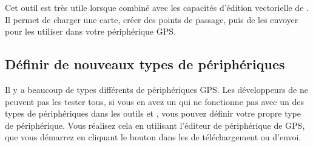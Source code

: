 Cet outil est très utile lorsque combiné avec les capacités d'édition vectorielle de \qg. Il permet de charger une carte, créer des points de passage, puis de les envoyer pour les utiliser dans votre périphérique GPS.

\subsection{Définir de nouveaux types de périphériques}\label{sec:Defining-new-device}

Il y a beaucoup de types différents de périphériques GPS.
Les développeurs de \qg ne peuvent pas les tester tous, si vous en avez un qui ne fonctionne pas avec un des types de périphériques dans les outils
 et , vous pouvez définir votre propre type de périphérique.
Vous réalisez cela en utilisant l'éditeur de périphérique de GPS, que vous démarrez en cliquant le bouton  dans les
de téléchargement ou d'envoi.

